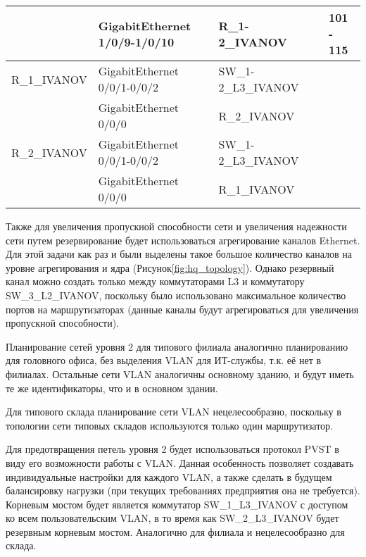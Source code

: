 \documentclass[14pt, a4paper]{extarticle}
\begin{document}
\begin{table}[H]
\begin{tabularx}{\textwidth}{|s|s|s|s|s|}
                                                                        & GigabitEthernet 1/0/9-1/0/10  & R\allowbreak\_1-2\allowbreak\_IVANOV                                                                        &               & 101 - 115 \\ \hline
    R\allowbreak\_1\allowbreak\_IVANOV & GigabitEthernet 0/0/1-0/0/2 & SW\allowbreak\_1-2\allowbreak\_L3\allowbreak\_IVANOV &  & \\ 
                                                        & GigabitEthernet 0/0/0       & R\allowbreak\_2\allowbreak\_IVANOV                   &  & \\ \hline
    R\allowbreak\_2\allowbreak\_IVANOV & GigabitEthernet 0/0/1-0/0/2 & SW\allowbreak\_1-2\allowbreak\_L3\allowbreak\_IVANOV &  & \\ 
                                                        & GigabitEthernet 0/0/0       & R\allowbreak\_1\allowbreak\_IVANOV                   &  & \\ \hline
  \end{tabularx}
\end{table}

Также для увеличения пропускной способности сети и увеличения
надежности сети путем резервирование будет использоваться
агрегирование каналов Ethernet. Для этой задачи как раз и были
выделены такое большое количество каналов на уровне агрегирования и
ядра (Рисунок\;\ref{fig:hq_topology}). Однако резервный канал можно
создать только между коммутаторами L3 и коммутатору SW\_3\_L2\_IVANOV,
поскольку было использовано максимальное количество портов на
маршрутизаторах (данные каналы будут агрегироваться для увеличения
пропускной способности).

Планирование сетей уровня 2 для типового филиала аналогично
планированию для головного офиса, без выделения VLAN для ИТ-службы,
т.к. её нет в филиалах. Остальные сети VLAN аналогичны основному
зданию, и будут иметь те же идентификаторы, что и в основном здании.

Для типового склада планирование сети VLAN нецелесообразно, поскольку
в топологии сети типовых складов используются только один
маршрутизатор.

Для предотвращения петель уровня 2 будет использоваться протокол
PVST\cite{stp-for-small} в виду его возможности работы с VLAN. Данная
особенность позволяет создавать индивидуальные настройки для каждого
VLAN, а также сделать в будущем балансировку нагрузки (при текущих
требованиях предприятия она не требуется).  Корневым мостом будет
является коммутатор SW\_1\_L3\_IVANOV с доступом ко всем
пользовательским VLAN, в то время как SW\_2\_L3\_IVANOV будет
резервным корневым мостом. Аналогично для филиала и нецелесообразно
для склада.
\end{document}
